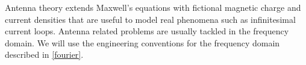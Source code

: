 Antenna theory extends Maxwell's equations with fictional magnetic charge and current densities that are useful to model
real phenomena such as infinitesimal current loops.
Antenna related problems are usually tackled in the frequency domain.  We will use the engineering conventions for the frequency domain described in \cref{fourier}.
%
%
%


